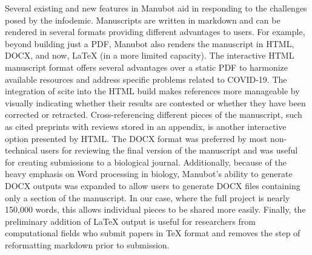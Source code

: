 \documentclass[twocolumn]{ceurart}
\begin{document}
Several existing and new features in Manubot aid in responding to the challenges posed by the infodemic.
Manuscripts are written in markdown and can be rendered in several formats providing different advantages to users.
For example, beyond building just a PDF, Manubot also renders the manuscript in HTML, DOCX, and now, LaTeX (in a more limited capacity).
The interactive HTML manuscript format offers several advantages over a static PDF to harmonize available resources and address specific problems related to COVID-19.
The integration of scite into the HTML build makes references more manageable by visually indicating whether their results are contested or whether they have been corrected or retracted.
Cross-referencing different pieces of the manuscript, such as cited preprints with reviews stored in an appendix, is another interactive option presented by HTML.
The DOCX format was preferred by most non-technical users for reviewing the final version of the manuscript and was useful for creating submissions to a biological journal.
Additionally, because of the heavy emphasis on Word processing in biology, Manubot's ability to generate DOCX outputs was expanded to allow users to generate DOCX files containing only a section of the manuscript.
In our case, where the full project is nearly 150,000 words, this allows individual pieces to be shared more easily.
Finally, the preliminary addition of LaTeX output is useful for researchers from computational fields who submit papers in TeX format and removes the step of reformatting markdown prior to submission.
\end{document}
